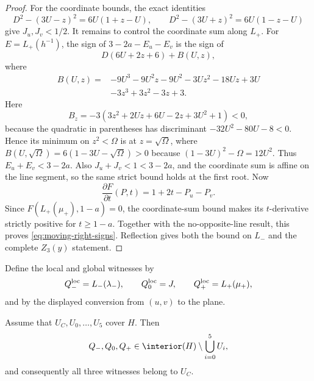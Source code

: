 \begin{proof}
For the coordinate bounds, the exact identities
\[
 D^2-(3U-z)^2=6U(1+z-U),\qquad
 D^2-(3U+z)^2=6U(1-z-U)
\]
give $J_u,J_v<1/2$.  It remains to control the coordinate sum along $L_+$.
For $E=L_+(h^{-1})$, the sign of $3-2a-E_u-E_v$ is the sign of
\[
 D(6U+2z+6)+B(U,z),
\]
where
\[
\begin{aligned}
 B(U,z)={}&-9U^3-9U^2z-9U^2-3Uz^2-18Uz+3U\\
          &-3z^3+3z^2-3z+3.
\end{aligned}
\]
Here
\[
 B_z=-3(3z^2+2Uz+6U-2z+3U^2+1)<0,
\]
because the quadratic in parentheses has discriminant
$-32U^2-80U-8<0$.  Hence its minimum on $z^2<\Omega$ is at
$z=\sqrt\Omega$, where
$B(U,\sqrt\Omega)=6(1-3U-\sqrt\Omega)>0$ because
$(1-3U)^2-\Omega=12U^2$.  Thus $E_u+E_v<3-2a$.
Also $J_u+J_v<1<3-2a$, and the coordinate sum is affine on the
line segment, so the same strict bound holds at the first root.  Now
\[
 \frac{\partial F}{\partial t}(P,t)=1+2t-P_u-P_v.
\]
Since $F(L_+(\mu_+),1-a)=0$, the coordinate-sum bound makes its $t$-derivative
strictly positive for $t\ge1-a$.  Together with the no-opposite-line result,
this proves \eqref{eq:moving-right-signs}.  Reflection gives both the bound on
$L_-$ and the complete $Z_3(y)$ statement.
\end{proof}

Define the local and global witnesses by
\begin{equation}
 Q_-^{\rm loc}=L_-(\lambda_-),\qquad
 Q_0^{\rm loc}=J,\qquad
 Q_+^{\rm loc}=L_+(\mu_+),                       \label{eq:asym-witnesses}
\end{equation}
and by the displayed conversion from $(u,v)$ to the plane.

\begin{lemma}
\label{lem:asymmetric-core-witness}
Assume that $U_C,U_0,\ldots,U_5$ cover $H$.  Then
\[
 Q_-,Q_0,Q_+
 \in\interior(H)\setminus\bigcup_{i=0}^5U_i,
\]
and consequently all three witnesses belong to $U_C$.
\end{lemma}

